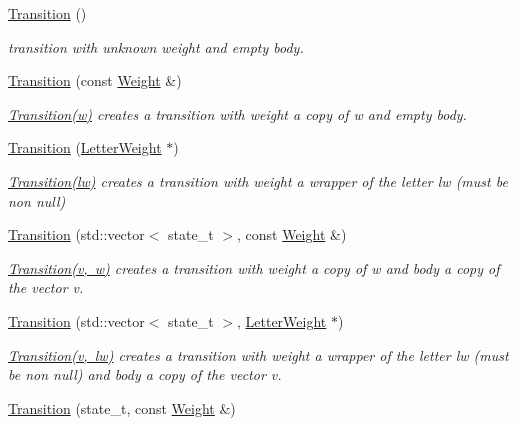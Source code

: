 \begin{DoxyCompactItemize}
\item 
\mbox{\hyperlink{group__schemata_ga73b44b2338b11807f77b620a3e810f92}{Transition}} ()
\begin{DoxyCompactList}\small\item\em transition with unknown weight and empty body. \end{DoxyCompactList}\item 
\mbox{\hyperlink{group__schemata_ga6e08e637325ab62ee6bfbdb99c8f8a71}{Transition}} (const \mbox{\hyperlink{classWeight}{Weight}} \&)
\begin{DoxyCompactList}\small\item\em \mbox{\hyperlink{classTransition}{Transition(w)}} creates a transition with weight a copy of w and empty body. \end{DoxyCompactList}\item 
\mbox{\hyperlink{group__schemata_ga09dca130387fcf6ead3f80cc523a59de}{Transition}} (\mbox{\hyperlink{classLetterWeight}{Letter\+Weight}} $\ast$)
\begin{DoxyCompactList}\small\item\em \mbox{\hyperlink{classTransition}{Transition(lw)}} creates a transition with weight a wrapper of the letter lw (must be non null) \end{DoxyCompactList}\item 
\mbox{\hyperlink{group__schemata_gad126f7c68acac0315b1782decaf54d3b}{Transition}} (std\+::vector$<$ state\+\_\+t $>$, const \mbox{\hyperlink{classWeight}{Weight}} \&)
\begin{DoxyCompactList}\small\item\em \mbox{\hyperlink{classTransition}{Transition(v, w)}} creates a transition with weight a copy of w and body a copy of the vector v. \end{DoxyCompactList}\item 
\mbox{\hyperlink{group__schemata_ga50836c0d84b3968b9ceb968521418e22}{Transition}} (std\+::vector$<$ state\+\_\+t $>$, \mbox{\hyperlink{classLetterWeight}{Letter\+Weight}} $\ast$)
\begin{DoxyCompactList}\small\item\em \mbox{\hyperlink{classTransition}{Transition(v, lw)}} creates a transition with weight a wrapper of the letter lw (must be non null) and body a copy of the vector v. \end{DoxyCompactList}\item 
\mbox{\hyperlink{group__schemata_ga3c71fb93c73a755408cc963975d4ffa5}{Transition}} (state\+\_\+t, const \mbox{\hyperlink{classWeight}{Weight}} \&)

\end{DoxyCompactItemize}
